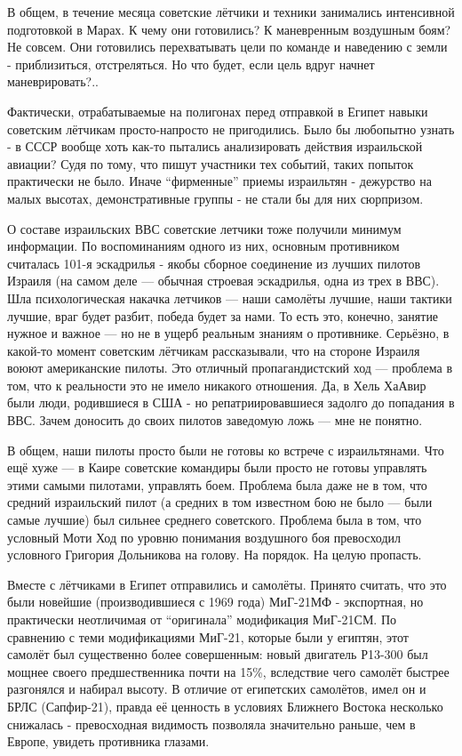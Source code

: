 В общем, в течение месяца советские лётчики и техники занимались интенсивной подготовкой в Марах. К чему они готовились? К маневренным воздушным боям? Не совсем. Они готовились перехватывать цели по команде и наведению с земли - приблизиться, отстреляться. Но что будет, если цель вдруг начнет маневрировать?..

Фактически, отрабатываемые на полигонах перед отправкой в Египет навыки советским лётчикам просто-напросто не пригодились. Было бы любопытно узнать - в СССР вообще хоть как-то пытались анализировать действия израильской авиации? Судя по тому, что пишут участники тех событий, таких попыток практически не было. Иначе “фирменные” приемы израильтян - дежурство на малых высотах, демонстративные группы - не стали бы для них сюрпризом.

О составе израильских ВВС советские летчики тоже получили минимум информации. По воспоминаниям одного из них, основным противником считалась 101-я эскадрилья - якобы сборное соединение из лучших пилотов Израиля (на самом деле — обычная строевая эскадрилья, одна из трех в ВВС). Шла психологическая накачка летчиков — наши самолёты лучшие, наши тактики лучшие, враг будет разбит, победа будет за нами. То есть это, конечно, занятие нужное и важное — но не в ущерб реальным знаниям о противнике. Серьёзно, в какой-то момент советским лётчикам рассказывали, что на стороне Израиля воюют американские пилоты. Это отличный пропагандистский ход — проблема в том, что к реальности это не имело никакого отношения. Да, в Хель ХаАвир были люди, родившиеся в США - но репатриировавшиеся задолго до попадания в ВВС. Зачем доносить до своих пилотов заведомую ложь — мне не понятно.

В общем, наши пилоты просто были не готовы ко встрече с израильтянами. Что ещё хуже — в Каире советские командиры были просто не готовы управлять этими самыми пилотами, управлять боем. Проблема была даже не в том, что средний израильский пилот (а средних в том известном бою не было — были самые лучшие) был сильнее среднего советского. Проблема была в том, что условный Моти Ход по уровню понимания воздушного боя превосходил условного Григория Дольникова на голову. На порядок. На целую пропасть.

Вместе с лётчиками в Египет отправились и самолёты. Принято считать, что это были новейшие (производившиеся с 1969 года) МиГ-21МФ - экспортная, но практически неотличимая от “оригинала” модификация МиГ-21СМ. По сравнению с теми модификациями МиГ-21, которые были у египтян, этот самолёт был существенно более совершенным: новый двигатель Р13-300 был мощнее своего предшественника почти на 15\%, вследствие чего самолёт быстрее разгонялся и набирал высоту. В отличие от египетских самолётов, имел он и БРЛС (Сапфир-21), правда её ценность в условиях Ближнего Востока несколько снижалась - превосходная видимость позволяла значительно раньше, чем в Европе, увидеть противника глазами.

